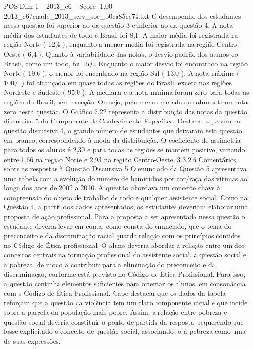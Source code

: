 \begin{textsample}{POS Dim 1 – 2013\_c6 – Score -1.00 – 2013\_c6/enade\_2013\_serv\_soc\_b0ca85ce74.txt}
O desempenho dos estudantes nessa questão foi superior ao da questão 3 e inferior ao da questão 4.
A nota média dos estudantes de todo o Brasil foi 8,1.
A maior média foi registrada na região Norte ( 12,4 ), enquanto a menor média foi registrada na região Centro-Oeste ( 6,4 ).
Quanto à variabilidade das notas, o desvio padrão dos alunos do Brasil, como um todo, foi 15,0.
Enquanto o maior desvio foi encontrado na região Norte ( 19,6 ), o menor foi encontrado na região Sul ( 13,0 ).
A nota máxima ( 100,0 ) foi alcançada em quase todas as regiões do Brasil, exceto nas regiões Nordeste e Sudeste ( 95,0 ).
A mediana e a nota mínima foram zero para todas as regiões do Brasil, sem exceção.
Ou seja, pelo menos metade dos alunos tirou nota zero nesta questão.
O Gráfico 3.22 representa a distribuição das notas da questão discursiva 5 do Componente de Conhecimento Específico.
Destaca -se, como na questão discursiva 4, o grande número de estudantes que deixaram esta questão em branco, correspondendo à moda da distribuição.
O coeficiente de assimetria para todos os alunos é 2,30 e para todas as regiões se mantém positivo, variando entre 1,66 na região Norte e 2,93 na região Centro-Oeste. 3.3.2.6 Comentários sobre as respostas à Questão Discursiva 5 O enunciado da Questão 5 apresentava uma tabela com a evolução do número de homicídios por cor/raça das vítimas ao longo dos anos de 2002 a 2010.
A questão abordava um conceito chave à compreensão do objeto de trabalho de todo e qualquer assistente social.
Como na Questão 4, a partir dos dados apresentados, os estudantes deveriam elaborar uma proposta de ação profissional.
Para a proposta a ser apresentada nessa questão o estudante deveria levar em conta, como consta do enunciado, que o tema do preconceito e da discriminação racial guarda relação com os princípios contidos no Código de Ética profissional.
O aluno deveria abordar a relação entre um dos conceitos centrais na formação profissional do assistente social, a questão social e a pobreza, de modo a contribuir para a eliminação do preconceito e da discriminação, conforme está previsto no Código de Ética Profissional.
Para isso, a questão continha elementos suficientes para orientar os alunos, em consonância com o Código de Ética Profissional.
Cabe destacar que os dados da tabela reforçam que a questão da violência tem um claro componente racial e que incide sobre a parcela da população mais pobre.
Assim, a relação entre pobreza e questão social deveria constituir o ponto de partida da resposta, requerendo que fosse explicitado o conceito de questão social, associando -o à pobreza como uma de suas expressões.

\end{textsample}

